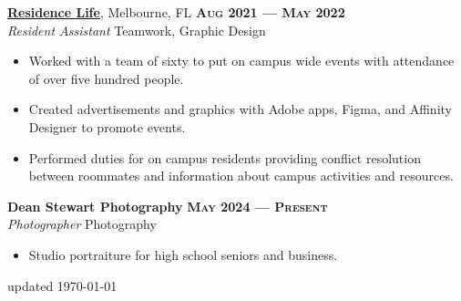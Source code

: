 \documentclass[margin,10pt]{res}
\begin{document}
\begin{resume}
        \href{https://www.fit.edu/reslife/}{\textbf{Residence Life}}, Melbourne, FL
        \hfill
        \textsc{\bfseries Aug 2021 --- May 2022}
        \\
        \textit{Resident Assistant}
        \hfill
        Teamwork, Graphic Design
        \vspace{0.5em}
        \begin{itemize}
            \item Worked with a team of sixty to put on campus wide events with attendance of over five hundred people.
            \item Created advertisements and graphics with Adobe apps, Figma, and Affinity Designer to promote events.
            \item Performed duties for on campus residents providing conflict resolution between roommates and information about campus activities and resources.
        \end{itemize}
        \vfill
        \textbf{Dean Stewart Photography}
        \hfill
        \textsc{\bfseries May 2024 --- Present}
        \\
        \textit{Photographer}
        \hfill
        Photography
        \vspace{0.5em}
        \begin{itemize}
            \item Studio portraiture for high school seniors and business.
        \end{itemize}
\end{resume}

\vfill

\begin{minipage}[t]{\textwidth}
    \flushright
    \small
    \sc \lsstyle
    \hfill updated \today
\end{minipage}
\end{document}
